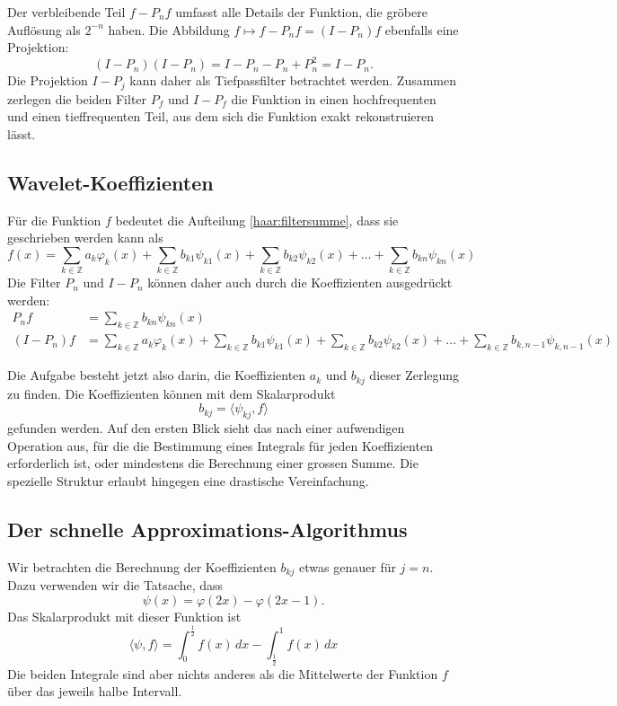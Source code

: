 Der verbleibende Teil $f-P_nf$ umfasst alle Details der Funktion, die
gröbere Auflösung als $2^{-n}$ haben.
Die Abbildung $f\mapsto f-P_nf = (I-P_n)f$ ebenfalls eine Projektion:
\[
(I-P_n)(I-P_n) = I -P_n - P_n + P_n^2 = I - P_n.
\]
Die Projektion $I-P_j$ kann daher als Tiefpassfilter betrachtet werden.
Zusammen zerlegen die beiden Filter $P_f$ und $I-P_f$ die Funktion
in einen hochfrequenten und einen tieffrequenten Teil, aus dem sich
die Funktion exakt rekonstruieren lässt.

\subsection{Wavelet-Koeffizienten}
Für die Funktion $f$ bedeutet die Aufteilung \eqref{haar:filtersumme},
dass sie geschrieben werden kann als
\[
f(x)
=
\sum_{k\in\mathbb Z} a_k\varphi_k(x)
+
\sum_{k\in\mathbb Z} b_{k1}\psi_{k1}(x)
+
\sum_{k\in\mathbb Z} b_{k2}\psi_{k2}(x)
+
\dots
+
\sum_{k\in\mathbb Z} b_{kn}\psi_{kn}(x)
\]
Die Filter $P_n$ und $I-P_n$ können daher auch durch die Koeffizienten
ausgedrückt werden:
\begin{align*}
P_nf 
&=
\sum_{k\in\mathbb Z} b_{kn}\psi_{kn}(x)
\\
(I-P_n)f
&=
\sum_{k\in\mathbb Z} a_k\varphi_k(x)
+
\sum_{k\in\mathbb Z} b_{k1}\psi_{k1}(x)
+
\sum_{k\in\mathbb Z} b_{k2}\psi_{k2}(x)
+
\dots
+
\sum_{k\in\mathbb Z} b_{k,n-1}\psi_{k,n-1}(x)
\end{align*}

Die Aufgabe besteht jetzt also darin, die Koeffizienten $a_k$ und
$b_{kj}$ dieser Zerlegung zu finden.
Die Koeffizienten können mit dem Skalarprodukt
\[
b_{kj} = \langle \psi_{kj}, f\rangle
\]
gefunden werden.
Auf den ersten Blick sieht das nach einer aufwendigen Operation
aus, für die die Bestimmung eines Integrals für jeden Koeffizienten
erforderlich ist, oder mindestens die Berechnung einer grossen Summe.
Die spezielle Struktur erlaubt hingegen eine drastische Vereinfachung.


\subsection{Der schnelle Approximations-Algorithmus}
Wir betrachten die Berechnung der Koeffizienten $b_{kj}$ etwas genauer für
$j=n$.
Dazu verwenden wir die Tatsache, dass 
\[
\psi(x) = \varphi(2x) - \varphi(2x-1).
\]
Das Skalarprodukt mit dieser Funktion ist
\[
\langle \psi,f\rangle
=
\int_0^{\frac12} f(x)\,dx - \int_{\frac12}^1 f(x)\,dx
\]
Die beiden Integrale sind aber nichts anderes als die Mittelwerte
der Funktion $f$ über das jeweils halbe Intervall.

